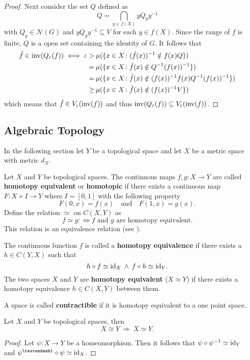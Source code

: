 \begin{proof}
  Next consider the set $Q$ defined as \[ Q = \bigcap\limits_{y \in f(X)}yQ_yy^{-1}\] with $Q_y \in \mathcal{N}(G)$ and $yQ_yy^{-1} \subseteq V$ for each $y \in f(X)$. Since the range of $f$ is finite, $Q$ is a open set containing the identity of $G$.
  It follows that
  \begin{align*}
    \tilde{f} \in {\rm inv}(Q_\varepsilon(f)) \iff \varepsilon > \: &\mu(\{x \in X\colon (\tilde{f}(x))^{-1} \notin f(x)Q\}) \\
    = \: &\mu(\{x \in X\colon \tilde{f}(x) \notin Q^{-1}(f(x))^{-1}\})\\
    = \: &\mu(\{x \in X\colon \tilde{f}(x) \notin (f(x))^{-1}f(x)Q^{-1}(f(x))^{-1}\})\\
    \geq \: &\mu(\{x \in X\colon \tilde{f}(x) \notin (f(x))^{-1}V\})             
  \end{align*}
  which means that $\tilde{f} \in V_{\varepsilon}({\rm inv}(f))$ and thus ${\rm inv}(Q_\varepsilon(f)) \subseteq V_{\varepsilon}({\rm inv}(f))$.
\end{proof}

\subsection{Algebraic Topology}
In the following section let $Y$ be a topological space and let $X$ be a metric space with metric $d_X$.

\begin{defin}
  Let $X$ and $Y$ be topological spaces. The continuous maps $f,g\colon X \to Y$ are called \textbf{homotopy equivalent} or \textbf{homotopic} if there exists a continuous map $F\colon X \times I \to Y$ where $I = [0, 1]$ with the following property \[F(0,x) = f(x) \quad \text{and} \quad F(1,x) = g(x).\]
 Define the relation $\simeq$ on $C(X, Y)$ as \[f \simeq g \colon\iff f \text{ and } g \text{ are homotopy equivalent}.\] This relation is an equivalence relation (see \cite[Lemma 51.1]{MunTop}). 

  The continuous function $f$ is called a \textbf{homotopy equivalence} if there exists a $h \in C(Y, X)$ such that
  \begin{equation*}
    h \circ f \simeq {\rm id}_X \: \land \: f \circ h \simeq {\rm id}_Y.
  \end{equation*}
  The two spaces $X$ and $Y$ are \textbf{homotopy equivalent} ($X \simeq Y$) if there exists a homotopy equivalence $h \in C(X, Y)$ between them.

  A space is called \textbf{contractible} if it is homotopy equivalent to a one point space.
\end{defin}

\begin{lemma}
  Let $X$ and $Y$ be topological spaces, then
  \begin{equation*}
    X \cong Y \: \Rightarrow \: X \simeq Y.
  \end{equation*}
\end{lemma}

\begin{proof}
  Let $\psi\colon X \to Y$ be a homeomorphism. Then it follows that $\psi \circ \psi^{-1} \simeq {\rm id}_Y$ and $\psi^{–1} \circ \psi \simeq \id_X$.  
\end{proof}
